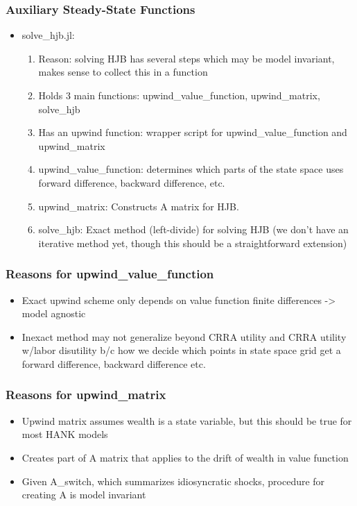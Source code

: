 \documentclass{beamer}
\begin{document}
\begin{frame}
\frametitle{Auxiliary Steady-State Functions}
\begin{itemize}
\item solve\_hjb.jl:
  \begin{enumerate}
  \item Reason: solving HJB has several steps which may be model invariant, makes sense to collect this in a function
  \item Holds 3 main functions: upwind\_value\_function, upwind\_matrix, solve\_hjb
  \item Has an upwind function: wrapper script for upwind\_value\_function and upwind\_matrix
  \item upwind\_value\_function: determines which parts of the state space uses forward difference, backward difference, etc.
  \item upwind\_matrix: Constructs A matrix for HJB.
  \item solve\_hjb: Exact method (left-divide) for solving HJB (we don't have an iterative method yet, though this should be a straightforward extension)
  \end{enumerate}
\end{itemize}
\end{frame}
\begin{frame}
  \frametitle{Reasons for upwind\_value\_function}
\begin{itemize}
\item Exact upwind scheme only depends on value function finite differences -> model agnostic
\item Inexact method may not generalize beyond CRRA utility and CRRA utility w/labor disutility b/c how we decide which points in state space grid get a forward difference, backward difference etc.
\end{itemize}
\end{frame}
\begin{frame}
  \frametitle{Reasons for upwind\_matrix}
  \begin{itemize}
  \item Upwind matrix assumes wealth is a state variable, but this should be true for most HANK models
  \item Creates part of A matrix that applies to the drift of wealth in value function
  \item Given A\_switch, which summarizes idiosyncratic shocks, procedure for creating A is model invariant
  \end{itemize}
\end{frame}
\end{document}
